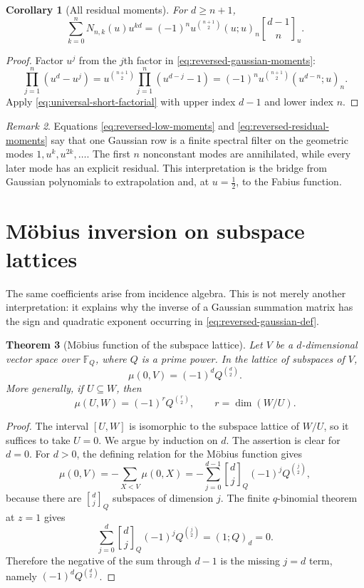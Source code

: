 \documentclass[11pt,oneside,openany]{book}
\newtheorem{theorem}{Theorem}[chapter]
\newtheorem{corollary}[theorem]{Corollary}
\theoremstyle{definition}
\theoremstyle{remark}
\newtheorem{remark}[theorem]{Remark}
\newcommand{\Qbinom}[3]{\genfrac{[}{]}{0pt}{}{#1}{#2}_{#3}}
\newcommand{\F}{\mathbb F}
\begin{document}
\begin{corollary}[All residual moments]\label{cor:reversed-residual-moments}
For $d\ge n+1$,
\begin{equation}
 \sum_{k=0}^nN_{n,k}(u)u^{kd}
 =(-1)^nu^{\binom{n+1}{2}}(u;u)_n
   \Qbinom{d-1}n u.\label{eq:reversed-residual-moments}
\end{equation}
\end{corollary}

\begin{proof}
Factor $u^j$ from the $j$th factor in \eqref{eq:reversed-gaussian-moments}:
\[
 \prod_{j=1}^n(u^d-u^j)
 =u^{\binom{n+1}{2}}\prod_{j=1}^n(u^{d-j}-1)
 =(-1)^nu^{\binom{n+1}{2}}(u^{d-n};u)_n.
\]
Apply \eqref{eq:universal-short-factorial} with upper index $d-1$ and lower index $n$.
\end{proof}

\begin{remark}
Equations \eqref{eq:reversed-low-moments} and \eqref{eq:reversed-residual-moments} say that one Gaussian row is a finite spectral filter on the geometric modes $1,u^k,u^{2k},\ldots$.  The first $n$ nonconstant modes are annihilated, while every later mode has an explicit residual.  This interpretation is the bridge from Gaussian polynomials to extrapolation and, at $u=\tfrac12$, to the Fabius function.
\end{remark}

\section{M\"obius inversion on subspace lattices}

The same coefficients arise from incidence algebra.  This is not merely another interpretation: it explains why the inverse of a Gaussian summation matrix has the sign and quadratic exponent occurring in \eqref{eq:reversed-gaussian-def}.

\begin{theorem}[M\"obius function of the subspace lattice]\label{thm:subspace-mobius}
Let $V$ be a $d$-dimensional vector space over $\F_Q$, where $Q$ is a prime power.  In the lattice of subspaces of $V$,
\begin{equation}
 \mu(0,V)=(-1)^dQ^{\binom d2}.\label{eq:subspace-mobius}
\end{equation}
More generally, if $U\subseteq W$, then
\[
 \mu(U,W)=(-1)^rQ^{\binom r2},\qquad r=\dim(W/U).
\]
\end{theorem}

\begin{proof}
The interval $[U,W]$ is isomorphic to the subspace lattice of $W/U$, so it suffices to take $U=0$.  We argue by induction on $d$.  The assertion is clear for $d=0$.  For $d>0$, the defining relation for the M\"obius function gives
\[
 \mu(0,V)=-\sum_{X<V}\mu(0,X)
 =-\sum_{j=0}^{d-1}\Qbinom djQ(-1)^jQ^{\binom j2},
\]
because there are $\Qbinom djQ$ subspaces of dimension $j$.  The finite $q$-binomial theorem at $z=1$ gives
\[
 \sum_{j=0}^{d}\Qbinom djQ(-1)^jQ^{\binom j2}
 =(1;Q)_d=0.
\]
Therefore the negative of the sum through $d-1$ is the missing $j=d$ term, namely $(-1)^dQ^{\binom d2}$.
\end{proof}
\end{document}
